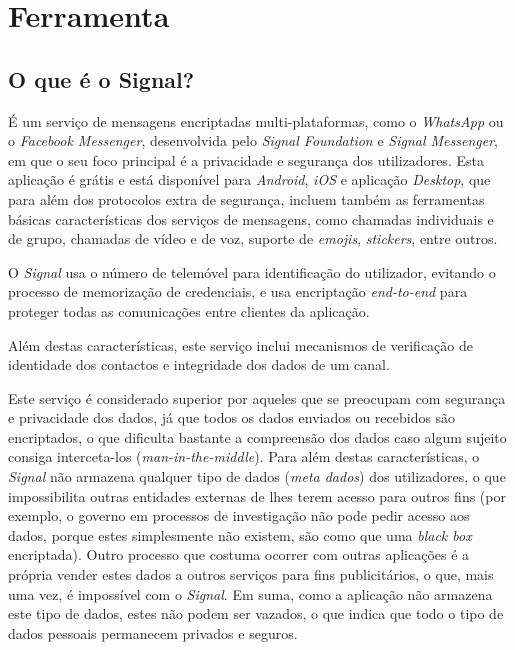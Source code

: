 \section{Ferramenta}

\vspace{-0.1cm}
\subsection{O que é o Signal?}
\label{sec:signal}

É um serviço de mensagens encriptadas multi-plataformas, como o \textit{WhatsApp} ou o \textit{Facebook Messenger}, desenvolvida pelo \textit{Signal Foundation} e \textit{Signal Messenger}, em que o seu foco principal é a privacidade e segurança dos utilizadores.
Esta aplicação é grátis e está disponível para  \textit{Android}, \textit{iOS} e aplicação \textit{Desktop},
que para além dos protocolos extra de segurança, incluem também as ferramentas básicas características dos serviços de mensagens, como chamadas individuais e de grupo, chamadas de vídeo e de voz, suporte de \textit{emojis}, \textit{stickers}, entre outros.

O \textit{Signal} usa o número de telemóvel para identificação do utilizador, evitando o processo de memorização de credenciais, e usa encriptação \textit{end-to-end} para proteger todas as comunicações entre clientes da aplicação.

Além destas características, este serviço inclui mecanismos de verificação de identidade dos contactos e integridade dos dados de um canal.

Este serviço é considerado superior por aqueles que se preocupam com segurança e privacidade dos dados, já que todos os dados enviados ou recebidos são encriptados, o que dificulta bastante a compreensão dos dados caso algum sujeito consiga interceta-los (\textit{man-in-the-middle}).
Para além destas características, o \textit{Signal} não armazena qualquer tipo de dados (\textit{meta dados}) dos utilizadores, o que impossibilita outras entidades externas de lhes terem acesso para outros fins (por exemplo, o governo em processos de investigação não pode pedir acesso aos dados, porque estes simplesmente não existem, são como que uma \textit{black box} encriptada). Outro processo que costuma ocorrer com outras aplicações é a própria vender estes dados a outros serviços para fins publicitários, o que, mais uma vez, é impossível com o \textit{Signal}. Em suma, como a aplicação não armazena este tipo de dados, estes não podem ser vazados, o que indica que todo o tipo de dados pessoais permanecem privados e seguros.

